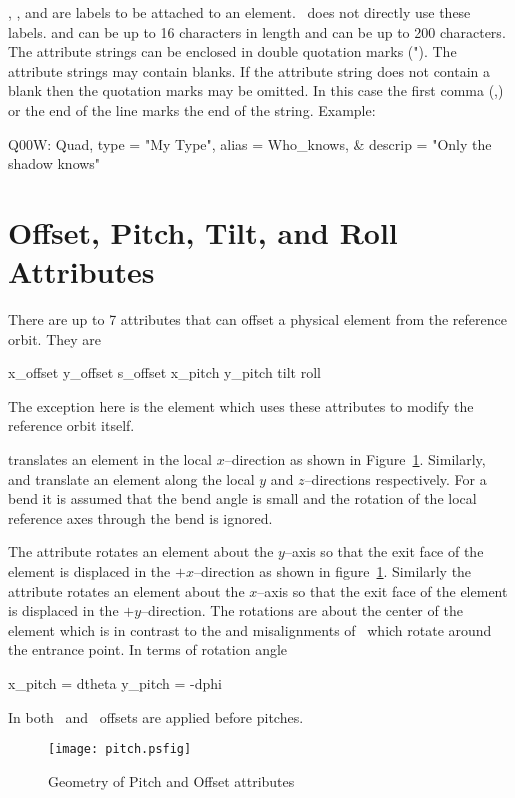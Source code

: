 , , and  are labels to be attached 
to an element. \bmad\ does not directly use these labels. 
and  can be up to 16 characters in length and 
can be up to 200 characters. The attribute strings can be enclosed in
double quotation marks ("). The attribute strings may contain
blanks. If the attribute string does not contain a blank then the
quotation marks may be omitted. In this case the first comma (,) or
the end of the line marks the end of the string. Example:
\begin{example}
  Q00W: Quad, type = "My Type", alias = Who_knows, &
                                  descrip = "Only the shadow knows"
\end{example}

\section{Offset, Pitch, Tilt, and Roll Attributes}
\label{s:offset}

There are up to 7 attributes that can offset a physical element
from the reference orbit. They are
\begin{example}
  x\_offset
  y\_offset
  s\_offset
  x\_pitch
  y\_pitch
  tilt
  roll
\end{example}
The exception here is the  element which uses these
attributes to modify the reference orbit itself.

 translates an element in the local $x$--direction
as shown in Figure~\ref{f:pitch}. Similarly,  and 
 translate an element along the local $y$ and 
$z$--directions respectively. For a bend it is assumed that
the bend angle is small and the rotation of the local reference
axes through the bend is ignored.

The  attribute rotates an element about the $y$--axis
so that the exit face of the element is displaced in the 
$+x$--direction as shown in figure~\ref{f:pitch}. Similarly
the  attribute rotates an element about the $x$--axis
so that the exit face of the element is displaced in the 
$+y$--direction. The rotations
are about the center of the element which is in contrast to the 
 and  misalignments of \mad\ which rotate
around the entrance point. In terms of rotation angle
\begin{example}
  x_pitch =  dtheta
  y_pitch = -dphi
\end{example}
In both \bmad\ and \mad\ offsets are applied before pitches.
\begin{figure}
  \centering
  \texttt{[image: pitch.psfig]}
  \caption{Geometry of Pitch and Offset attributes}
  \label{f:pitch}
\end{figure}

